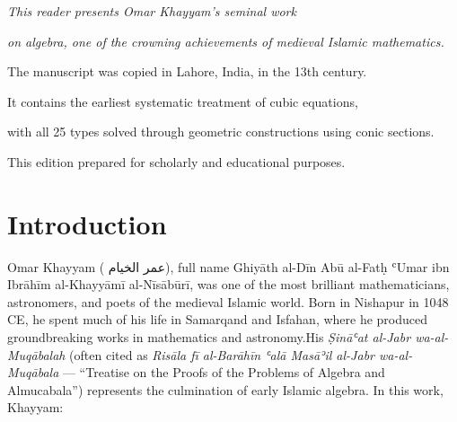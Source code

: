 

\thispagestyle{empty}
\vspace*{10cm}

\begin{center}

{\small
\textit{This reader presents Omar Khayyam's seminal work}}

{\small
\textit{on algebra, one of the crowning achievements of medieval Islamic mathematics.}}

\vspace{0.5cm}
{\small The manuscript was copied in Lahore, India, in the 13th century.}

{\small It contains the earliest systematic treatment of cubic equations,}

{\small with all 25 types solved through geometric constructions using conic sections.}

\vspace{0.5cm}

{\footnotesize This edition prepared for scholarly and educational purposes.}

\end{center}

\clearpage

\tableofcontents

\clearpage

\section{Introduction}

\label{sec:intro}

Omar Khayyam (
\textarabic{عمر الخيام}), full name Ghiyāth al-Dīn Abū al-Fatḥ ʿUmar ibn Ibrāhīm al-Khayyāmī al-Nīsābūrī, was one of the most brilliant mathematicians, astronomers, and poets of the medieval Islamic world. Born in Nishapur in 1048 CE, he spent much of his life in Samarqand and Isfahan, where he produced groundbreaking works in mathematics and astronomy.His 
\textit{Ṣināʿat al-Jabr wa-al-Muqābalah} (often cited as 
\textit{Risāla fī al-Barāhīn ʿalā Masāʾil al-Jabr wa-al-Muqābala} --- ``Treatise on the Proofs of the Problems of Algebra and Almucabala'') represents the culmination of early Islamic algebra. In this work, Khayyam:

